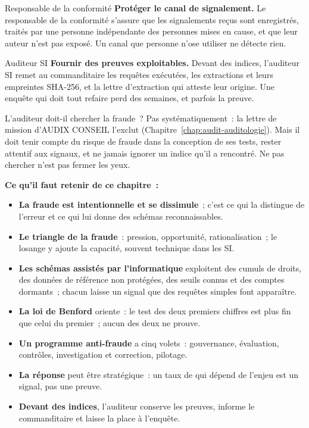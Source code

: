 \begin{boxmetier}{Responsable de la conformité}
\textbf{Protéger le canal de signalement.} Le responsable de la conformité
s'assure que les signalements reçus sont enregistrés, traités par une
personne indépendante des personnes mises en cause, et que leur auteur
n'est pas exposé. Un canal que personne n'ose utiliser ne détecte rien.
\end{boxmetier}

\begin{boxmetier}{Auditeur SI}
\textbf{Fournir des preuves exploitables.} Devant des indices, l'auditeur
SI remet au commanditaire les requêtes exécutées, les extractions et leurs
empreintes SHA-256, et la lettre d'extraction qui atteste leur origine.
Une enquête qui doit tout refaire perd des semaines, et parfois la preuve.
\end{boxmetier}

\begin{boiteRemarque}{L'auditeur doit-il chercher la fraude~?}
Pas systématiquement~: la lettre de mission d'AUDIX CONSEIL l'exclut
(Chapitre~\ref{chap:audit-auditologie}). Mais il doit tenir compte du risque
de fraude dans la conception de ses tests, rester attentif aux signaux, et
ne jamais ignorer un indice qu'il a rencontré. Ne pas chercher n'est pas
fermer les yeux.
\end{boiteRemarque}

\separateur

\begin{boxresume}
\textbf{Ce qu'il faut retenir de ce chapitre~:}
\begin{itemize}
    \item \textbf{La fraude est intentionnelle et se dissimule}~; c'est ce
          qui la distingue de l'erreur et ce qui lui donne des schémas
          reconnaissables.
    \item \textbf{Le triangle de la fraude}~: pression, opportunité,
          rationalisation~; le losange y ajoute la capacité, souvent
          technique dans les SI.
    \item \textbf{Les schémas assistés par l'informatique} exploitent des
          cumuls de droits, des données de référence non protégées, des
          seuils connus et des comptes dormants~; chacun laisse un signal
          que des requêtes simples font apparaître.
    \item \textbf{La loi de Benford} oriente~: le test des deux premiers
          chiffres est plus fin que celui du premier~; aucun des deux ne
          prouve.
    \item \textbf{Un programme anti-fraude} a cinq volets~: gouvernance,
          évaluation, contrôles, investigation et correction, pilotage.
    \item \textbf{La réponse \NEK{}} peut être stratégique~: un taux de \NEK{}
          qui dépend de l'enjeu est un signal, pas une preuve.
    \item \textbf{Devant des indices}, l'auditeur conserve les preuves,
          informe le commanditaire et laisse la place à l'enquête.
\end{itemize}
\end{boxresume}

